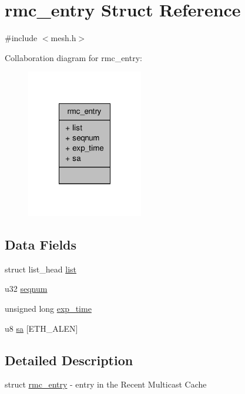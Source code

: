 \hypertarget{structrmc__entry}{\section{rmc\-\_\-entry Struct Reference}
\label{structrmc__entry}
}


{\ttfamily \#include $<$mesh.\-h$>$}



Collaboration diagram for rmc\-\_\-entry\-:
\nopagebreak
\begin{figure}[H]
\begin{center}
\leavevmode
\includegraphics[width=144pt]{structrmc__entry__coll__graph}
\end{center}
\end{figure}
\subsection*{Data Fields}
\begin{DoxyCompactItemize}
\item 
struct list\-\_\-head \hyperlink{structrmc__entry_a1f00f18b91d5a820f2c43064243aa86e}{list}
\item 
u32 \hyperlink{structrmc__entry_aa1de03f6f57c53b7e53eb6f83507da76}{seqnum}
\item 
unsigned long \hyperlink{structrmc__entry_af01b3e5a14761c34e4298e254fb7c094}{exp\-\_\-time}
\item 
u8 \hyperlink{structrmc__entry_a1d248d85a9aee0de13f6a2647297e517}{sa} \mbox{[}E\-T\-H\-\_\-\-A\-L\-E\-N\mbox{]}
\end{DoxyCompactItemize}


\subsection{Detailed Description}
struct \hyperlink{structrmc__entry}{rmc\-\_\-entry} -\/ entry in the Recent Multicast Cache

